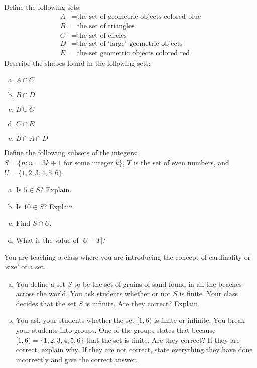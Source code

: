 \documentclass[11pt,letterpaper]{article}
\begin{document}

 Define the following sets:
	\[
	\begin{aligned}
	A&= \text{the set of geometric objects colored blue} \\
	B&= \text{the set of triangles} \\
	C&= \text{the set of circles} \\
	D&= \text{the set of `large' geometric objects} \\
	E&= \text{the set geometric objects colored red}
	\end{aligned}
	\]
Describe the shapes found in the following sets:
	\begin{enumerate}[(a)]
	\item $A \cap C$
	\item $B \cap D$
	\item $B \cup C$
	\item $C \cap E^c$
	\item $B \cap A \cap D$
	\end{enumerate}



\newpage



 Define the following subsets of the integers: $S= \{ n \colon n= 3k + 1 \text{ for some integer } k \}$, $T$ is the set of even numbers, and $U= \{ 1, 2, 3, 4, 5, 6 \}$. 
	\begin{enumerate}[(a)]
	\item Is $5 \in S$? Explain.
	\item Is $10 \in S$? Explain.
	\item Find $S \cap U$.
	\item What is the value of $|U - T|$?
	\end{enumerate}



\newpage



 You are teaching a class where you are introducing the concept of cardinality or `size' of a set. 
	\begin{enumerate}[(a)]
	\item You define a set $S$ to be the set of grains of sand found in all the beaches across the world. You ask students whether or not $S$ is finite. Your class decides that the set $S$ is infinite. Are they correct? Explain. 
	\item You ask your students whether the set $[1, 6)$ is finite or infinite. You break your students into groups. One of the groups states that because $[1, 6)= \{ 1, 2, 3, 4, 5, 6 \}$ that the set is finite. Are they correct? If they are correct, explain why. If they are not correct, state everything they have done incorrectly and give the correct answer. 
	\end{enumerate}
\end{document}
